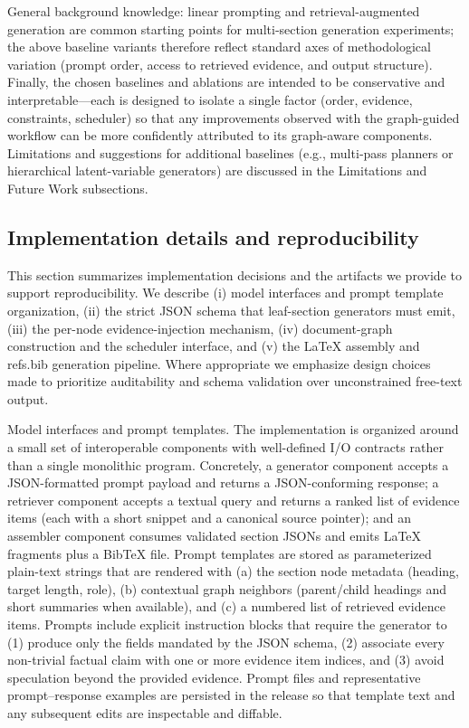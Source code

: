 \documentclass{article}%
\begin{document}
General background knowledge: linear prompting and retrieval-augmented generation are common starting points for multi‑section generation experiments; the above baseline variants therefore reflect standard axes of methodological variation (prompt order, access to retrieved evidence, and output structure). Finally, the chosen baselines and ablations are intended to be conservative and interpretable—each is designed to isolate a single factor (order, evidence, constraints, scheduler) so that any improvements observed with the graph-guided workflow can be more confidently attributed to its graph-aware components. Limitations and suggestions for additional baselines (e.g., multi‑pass planners or hierarchical latent-variable generators) are discussed in the Limitations and Future Work subsections.%

%
\subsection{Implementation details and reproducibility}%


%
This section summarizes implementation decisions and the artifacts we provide to support reproducibility. We describe (i) model interfaces and prompt template organization, (ii) the strict JSON schema that leaf-section generators must emit, (iii) the per-node evidence-injection mechanism, (iv) document-graph construction and the scheduler interface, and (v) the LaTeX assembly and refs.bib generation pipeline. Where appropriate we emphasize design choices made to prioritize auditability and schema validation over unconstrained free-text output.

Model interfaces and prompt templates.
The implementation is organized around a small set of interoperable components with well-defined I/O contracts rather than a single monolithic program. Concretely, a generator component accepts a JSON-formatted prompt payload and returns a JSON-conforming response; a retriever component accepts a textual query and returns a ranked list of evidence items (each with a short snippet and a canonical source pointer); and an assembler component consumes validated section JSONs and emits LaTeX fragments plus a BibTeX file. Prompt templates are stored as parameterized plain-text strings that are rendered with (a) the section node metadata (heading, target length, role), (b) contextual graph neighbors (parent/child headings and short summaries when available), and (c) a numbered list of retrieved evidence items. Prompts include explicit instruction blocks that require the generator to (1) produce only the fields mandated by the JSON schema, (2) associate every non-trivial factual claim with one or more evidence item indices, and (3) avoid speculation beyond the provided evidence. Prompt files and representative prompt–response examples are persisted in the release so that template text and any subsequent edits are inspectable and diffable.
\end{document}
